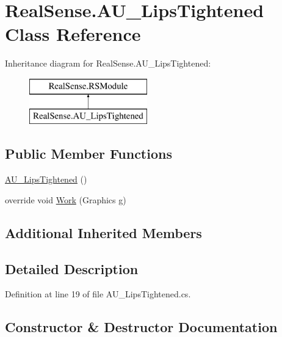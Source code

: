\hypertarget{class_real_sense_1_1_a_u___lips_tightened}{}\section{Real\+Sense.\+A\+U\+\_\+\+Lips\+Tightened Class Reference}
\label{class_real_sense_1_1_a_u___lips_tightened}
Inheritance diagram for Real\+Sense.\+A\+U\+\_\+\+Lips\+Tightened\+:\begin{figure}[H]
\begin{center}
\leavevmode
\includegraphics[height=2.000000cm]{class_real_sense_1_1_a_u___lips_tightened}
\end{center}
\end{figure}
\subsection*{Public Member Functions}
\begin{DoxyCompactItemize}
\item 
\hyperlink{class_real_sense_1_1_a_u___lips_tightened_abcb4ab60b321ea1e7edf7f1521aa30de}{A\+U\+\_\+\+Lips\+Tightened} ()
\item 
override void \hyperlink{class_real_sense_1_1_a_u___lips_tightened_a409b75e75c7b72c628ea6479a50ed75f}{Work} (Graphics g)
\end{DoxyCompactItemize}
\subsection*{Additional Inherited Members}


\subsection{Detailed Description}


Definition at line 19 of file A\+U\+\_\+\+Lips\+Tightened.\+cs.



\subsection{Constructor \& Destructor Documentation}
\mbox{\label{class_real_sense_1_1_a_u___lips_tightened_abcb4ab60b321ea1e7edf7f1521aa30de}} 
